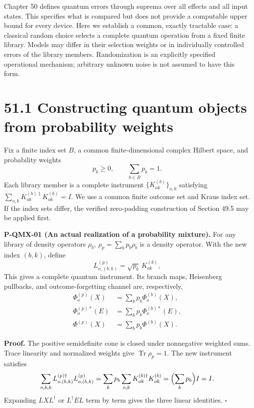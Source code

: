 \documentclass[
  11pt,
  oneside]{book}
\begin{document}
Chapter 50 defines quantum errors through suprema over all effects and
all input states. This specifies what is compared but does not provide a
computable upper bound for every device. Here we establish a common,
exactly tractable case: a classical random choice selects a complete
quantum operation from a fixed finite library. Models may differ in
their selection weights or in individually controlled errors of the
library members. Randomization is an explicitly specified operational
mechanism; arbitrary unknown noise is not assumed to have this form.

\section{51.1 Constructing quantum objects from probability weights}

Fix a finite index set \(B\), a common finite-dimensional complex
Hilbert space, and probability weights \[
p_b\ge0,\qquad \sum_{b\in B}p_b=1.
\] Each library member is a complete instrument
\(\{K^{(b)}_{ok}\}_{o,k}\) satisfying
\(\sum_{o,k}K^{(b)\dagger}_{ok}K^{(b)}_{ok}=I\). We use a common finite
outcome set and Kraus index set. If the index sets differ, the verified
zero-padding construction of Section 49.5 may be applied first.

\label{p-qmx-01}{}

\textbf{P-QMX-01 (An actual realization of a probability mixture).} For
any library of density operators \(\rho_b\), \(\rho_p=\sum_b p_b\rho_b\)
is a density operator. With the new index \((b,k)\), define \[
L^{(p)}_{o,(b,k)}=\sqrt{p_b}\,K^{(b)}_{ok},
\] This gives a complete quantum instrument. Its branch maps, Heisenberg
pullbacks, and outcome-forgetting channel are, respectively, \[
\begin{aligned}
\Phi^{(p)}_o(X)&=\sum_b p_b\Phi^{(b)}_o(X),\\
\Phi^{(p)*}_o(E)&=\sum_b p_b\Phi^{(b)*}_o(E),\\
\Phi^{(p)}(X)&=\sum_b p_b\Phi^{(b)}(X).
\end{aligned}
\]

\textbf{Proof.} The positive semidefinite cone is closed under
nonnegative weighted sums. Trace linearity and normalized weights give
\(\operatorname{Tr}\rho_p=1\). The new instrument satisfies \[
\sum_{o,b,k}L^{(p)\dagger}_{o,(b,k)}L^{(p)}_{o,(b,k)}
=\sum_b p_b\sum_{o,k}K^{(b)\dagger}_{ok}K^{(b)}_{ok}
=\Bigl(\sum_b p_b\Bigr)I=I.
\] Expanding \(LXL^\dagger\) or \(L^\dagger EL\) term by term gives the
three linear identities. \(\square\)
\end{document}
